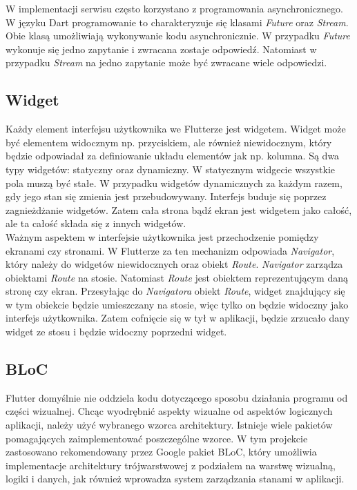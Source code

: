 W implementacji serwisu często korzystano z programowania asynchronicznego. W języku Dart programowanie to charakteryzuje się klasami \emph{Future} oraz \emph{Stream}. Obie klasą umożliwiają wykonywanie kodu asynchronicznie. W przypadku \emph{Future} wykonuje się jedno zapytanie i zwracana zostaje odpowiedź. Natomiast w przypadku \emph{Stream} na jedno zapytanie może być zwracane wiele odpowiedzi.

\subsection{Widget}

Każdy element interfejsu użytkownika we Flutterze jest widgetem. Widget może być elementem widocznym np. przyciskiem, ale również niewidocznym, który będzie odpowiadał za definiowanie układu elementów jak np. kolumna. Są dwa typy widgetów: statyczny oraz dynamiczny. W statycznym widgecie wszystkie pola muszą być stałe. W przypadku widgetów dynamicznych za każdym razem, gdy jego stan się zmienia jest przebudowywany. Interfejs buduje się  poprzez zagnieżdżanie widgetów. Zatem cała strona bądź ekran jest widgetem jako całość, ale ta całość składa się z innych widgetów. \\

Ważnym aspektem w interfejsie użytkownika jest przechodzenie pomiędzy ekranami czy stronami. W Flutterze za ten mechanizm odpowiada \emph{Navigator}, który należy do widgetów niewidocznych oraz obiekt \emph{Route}. \emph{Navigator} zarządza obiektami \emph{Route} na stosie. Natomiast \emph{Route} jest obiektem reprezentującym daną stronę czy ekran. Przesyłając do \emph{Navigatora} obiekt \emph{Route}, widget znajdujący się w tym obiekcie będzie umieszczany na stosie, więc tylko on będzie widoczny jako interfejs użytkownika. Zatem cofnięcie się w tył w aplikacji, będzie zrzucało dany widget ze stosu i będzie widoczny poprzedni widget.

\subsection{BLoC}

Flutter domyślnie nie oddziela kodu dotyczącego sposobu działania programu od części wizualnej. Chcąc wyodrębnić aspekty wizualne od aspektów logicznych aplikacji, należy użyć wybranego wzorca architektury. Istnieje wiele pakietów pomagających zaimplementować poszczególne wzorce. W tym projekcie zastosowano rekomendowany przez Google pakiet BLoC, który umożliwia implementacje architektury trójwarstwowej z podziałem na warstwę wizualną, logiki i danych, jak również wprowadza system zarządzania stanami w aplikacji. \\


